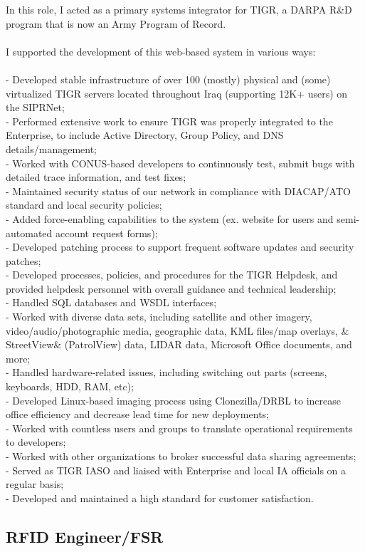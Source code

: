 \documentclass{article}
\begin{document}
{\noindent}In this role, I acted as a primary systems integrator for TIGR, a DARPA R\&D program that is now an Army Program of Record.\\\\I supported the development of this web-based system in various ways:\\\\- Developed stable infrastructure of over 100 (mostly) physical and (some) virtualized TIGR servers located throughout Iraq (supporting 12K+ users) on the SIPRNet;\\- Performed extensive work to ensure TIGR was properly integrated to the Enterprise, to include Active Directory, Group Policy, and DNS details/management;\\- Worked with CONUS-based developers to continuously test, submit bugs with detailed trace information, and test fixes;\\- Maintained security status of our network in compliance with DIACAP/ATO standard and local security policies;\\- Added force-enabling capabilities to the system (ex. website for users and semi-automated account request forms);\\- Developed patching process to support frequent software updates and security patches;\\- Developed processes, policies, and procedures for the TIGR Helpdesk, and provided helpdesk personnel with overall guidance and technical leadership;\\- Handled SQL databases and WSDL interfaces;\\- Worked with diverse data sets, including satellite and other imagery, video/audio/photographic media, geographic data, KML files/map overlays, & StreetView&  (PatrolView) data, LIDAR data, Microsoft Office documents, and more;\\- Handled hardware-related issues, including switching out parts (screens, keyboards, HDD, RAM, etc);\\- Developed Linux-based imaging process using Clonezilla/DRBL to increase office efficiency and decrease lead time for new deployments;\\- Worked with countless users and groups to translate operational requirements to developers;\\- Worked with other organizations to broker successful data sharing agreements;\\- Served as TIGR IASO and liaised with Enterprise and local IA officials on a regular basis;\\- Developed and maintained a high standard for customer satisfaction.
\\\subsection { RFID Engineer/FSR }
\end{document}
